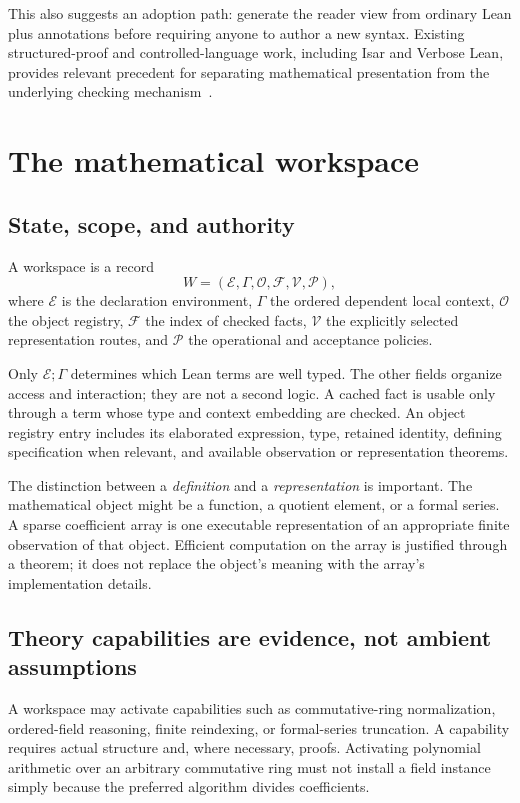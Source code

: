 \documentclass[11pt,letterpaper]{article}
\theoremstyle{definition}
\theoremstyle{remark}
\begin{document}
This also suggests an adoption path: generate the reader view from ordinary
Lean plus annotations before requiring anyone to author a new syntax. Existing
structured-proof and controlled-language work, including Isar and Verbose Lean,
provides relevant precedent for separating mathematical presentation from the
underlying checking mechanism~\cite{isar,verbose}.

\section{The mathematical workspace}
\label{sec:workspace}

\subsection{State, scope, and authority}
A workspace is a record
\[
 W=(\mathcal E,\Gamma,\mathcal O,\mathcal F,\mathcal V,\mathcal P),
\]
where $\mathcal E$ is the declaration environment, $\Gamma$ the ordered dependent
local context, $\mathcal O$ the object registry, $\mathcal F$ the index of checked
facts, $\mathcal V$ the explicitly selected representation routes, and
$\mathcal P$ the operational and acceptance policies.

Only $\mathcal E;\Gamma$ determines which Lean terms are well typed. The other
fields organize access and interaction; they are not a second logic. A cached
fact is usable only through a term whose type and context embedding are checked.
An object registry entry includes its elaborated expression, type, retained
identity, defining specification when relevant, and available observation or
representation theorems.

The distinction between a \emph{definition} and a \emph{representation} is
important. The mathematical object might be a function, a quotient element,
or a formal series. A sparse coefficient array is one executable representation
of an appropriate finite observation of that object. Efficient computation on
the array is justified through a theorem; it does not replace the object's
meaning with the array's implementation details.

\subsection{Theory capabilities are evidence, not ambient assumptions}
A workspace may activate capabilities such as commutative-ring normalization,
ordered-field reasoning, finite reindexing, or formal-series truncation. A
capability requires actual structure and, where necessary, proofs. Activating
polynomial arithmetic over an arbitrary commutative ring must not install a
field instance simply because the preferred algorithm divides coefficients.
\end{document}
